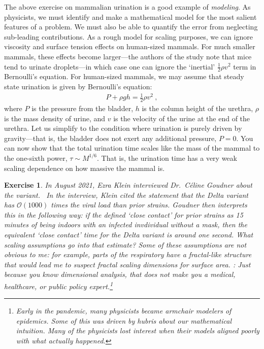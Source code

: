 \documentclass[
  11pt,
	colorful,
	raggedright,
]{tufte-style-thesis-flip}
\newtheorem{exercise}{Exercise}[section]
\begin{document}
The above exercise on mammalian urination is a good example of \emph{modeling}. As physicists, we must identify and make a mathematical model for the most salient features of a problem. We must also be able to quantify the error from neglecting sub-leading contributions. As a rough model for scaling purposes, we can ignore viscosity and surface tension effects on human-sized mammals. For much smaller mammals, these effects become larger---the authors of the study note that mice tend to urinate droplets---in which case one can ignore the `inertial' $\frac{1}{2} \rho v^2$ term in Bernoulli's equation. For human-sized mammals, we may assume that steady state urination is given by Bernoulli's equation:
\begin{align}
  P + \rho g h = \frac{1}{2}\rho v^2 \ ,
\end{align}
where $P$ is the pressure from the bladder, $h$ is the column height of the urethra, $\rho$ is the mass density of urine, and $v$ is the velocity of the urine at the end of the urethra. Let us simplify to the condition where urination is purely driven by gravity---that is, the bladder does not exert any additional pressure, $P=0$. You can now show that the total urination time scales like the mass of the mammal to the one-sixth power, $\tau \sim M^{1/6}$. That is, the urination time has a very weak scaling dependence on how massive the mammal is.

\begin{exercise}
In August 2021, Ezra Klein interviewed Dr.~C\'eline Goudner about the  variant.~ In the interview, Klein cited the statement that the Delta variant has $\mathcal O(1000)$ times the viral load than prior  strains. Goudner then interprets this in the following way: if the  defined `close contact' for prior strains as 15 minutes of being indoors with an infected invdividual without a mask, then the equivalent `close contact' time for the Delta variant is around \emph{one second}. What scaling assumptions go into that estimate? Some of these assumptions are not obvious to me: for example, parts of the respiratory have a fractal-like structure that would lead me to suspect fractal scaling dimensions for surface area. : Just because you know dimensional analysis, that does not make you a medical, healthcare, or public policy expert.\footnote{Early in the  pandemic, many physicists became armchair  modelers of epidemics. Some of this was driven by hubris about our mathematical intuition. Many of the physicists lost interest when their models aligned poorly with what actually happened.} 
\end{exercise}
\end{document}
